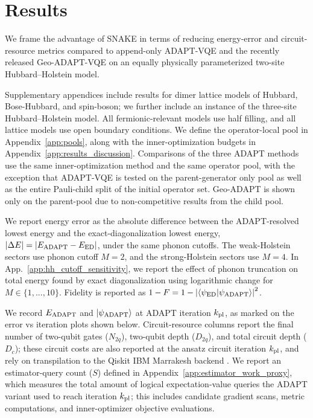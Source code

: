 \documentclass[
  reprint,
  amsmath,
  amssymb,
  aps,
  pra,
  nofootinbib,
  superscriptaddress,
  floatfix
]{revtex4-2}
\newcommand{\ket}[1]{|#1\rangle}
\newcommand{\braket}[2]{\langle #1|#2\rangle}
\begin{document}


\section{Results}
\label{sec:results}
\label{sec:benchmarks}

We frame the advantage of SNAKE in terms of reducing energy-error and circuit-resource metrics compared to append-only ADAPT-VQE and the recently released Geo-ADAPT-VQE on an equally physically parameterized two-site Hubbard--Holstein model. 

Supplementary appendices include results for dimer lattice models of Hubbard, Bose-Hubbard, and spin-boson; we further include an instance of the three-site Hubbard--Holstein model. All fermionic-relevant models use half filling, and all lattice models use open boundary conditions. We define the operator-local pool in Appendix~\ref{app:pools}, along with the inner-optimization budgets in Appendix~\ref{app:results_discussion}. Comparisons of the three ADAPT methods use the same inner-optimization method and the same operator pool, with the exception that ADAPT-VQE is tested on the parent-generator only pool as well as the entire Pauli-child split of the initial operator set. Geo-ADAPT is shown only on the parent-pool due to non-competitive results from the child pool.

We report energy error as the absolute difference between the ADAPT-resolved lowest energy and the exact-diagonalization lowest energy, \(|\Delta E|=|E_{\rm ADAPT}-E_{\rm ED}|\), under the same phonon cutoffs. The weak-Holstein sectors use phonon cutoff \(M=2\), and the strong-Holstein sectors use \(M=4\).
In App.~\ref{app:hh_cutoff_sensitivity}, we report the effect of phonon truncation on total energy found by exact diagonalization using logarithmic change for $M\in\{1,...,10\}.$ Fidelity is reported as \(1-F=1-\left|\braket{\psi_{\rm ED}}{\psi_{\rm ADAPT}}\right|^2\).

We record $E_{\rm{ADAPT}}$ and $\ket{\psi_{\rm{ADAPT}}}$ at ADAPT iteration $k_{\rm{pl}}$, as marked on the error vs iteration plots shown below. Circuit-resource columns report the final number of two-qubit gates (\(N_{2q}\)), two-qubit depth (\(D_{2q}\)), and total circuit depth (\(D_c\)); these circuit costs are also reported at the ansatz circuit iteration \(k_{\rm pl}\), and rely on transpilation to the Qiskit IBM Marrakesh backend \cite{JavadiAbhari2024Qiskit,QiskitAlgorithmsAdaptVQE}. We report an estimator-query count (\(S\)) defined in Appendix~\ref{app:estimator_work_proxy}, which measures the total amount of logical expectation-value queries the ADAPT variant used to reach iteration \(k_{\rm pl}\); this includes candidate gradient scans, metric computations, and inner-optimizer objective evaluations.
\end{document}

